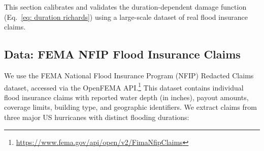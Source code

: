 This section calibrates and validates the duration-dependent damage function (Eq.~\ref{eq: duration richards}) using a large-scale dataset of real flood insurance claims.

\subsection{Data: FEMA NFIP Flood Insurance Claims}
\label{ssec: fema data}

We use the FEMA National Flood Insurance Program (NFIP) Redacted Claims dataset, accessed via the OpenFEMA API.\footnote{\url{https://www.fema.gov/api/open/v2/FimaNfipClaims}} This dataset contains individual flood insurance claims with reported water depth (in inches), payout amounts, coverage limits, building type, and geographic identifiers. We extract claims from three major US hurricanes with distinct flooding durations:

\begin{table}[h!]
\centering
{}
\caption{FEMA NFIP claims used for calibration (OpenFEMA snapshot 2026-05-09). ``Valid'' denotes claims with positive water depth, positive payout, positive coverage, and damage ratio in $(0, 1.5]$, capped at 1.0. Damage ratio = total payout / total coverage. Typical duration $\tau$ assigned from FEMA flood extent reports and hydrological literature. The earlier preprint version used a Mar 2026 OpenFEMA snapshot containing 354{,}413 raw / 317{,}943 valid claims; FEMA has since retroactively backfilled $\sim$91{,}000 historical claims, the majority of which lack a recorded water depth and therefore fail the validity filter. The full filter funnel from the 445{,}594 raw records to the 295{,}637 valid records is reported in Appendix~\ref{app: funnel}.}
\label{tab: fema data}
\end{table}

